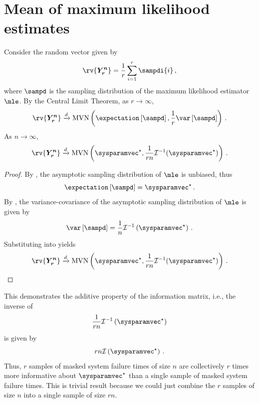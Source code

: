 \documentclass[../main.tex]{subfiles}
\begin{document}
\chapter{Mean of maximum likelihood estimates}
Consider the random vector given by
\begin{equation}
    \rv{\vec{Y_r^n}} = \frac{1}{r} \sum_{i=1}^{r} \sampdi{i}\,,
\end{equation}
where $\sampd$ is the sampling distribution of the maximum likelihood estimator $\mle$. By the Central Limit Theorem, as $r \to \infty$,
\begin{equation}
\label{eq:clt_y_rn}
    \rv{\vec{Y_r^n}} \xrightarrow{d} \mvn\left(\expectation\left[\sampd\right], \frac{1}{r} \var\left[\sampd\right]\right)\,.
\end{equation}
As $n \to \infty$,
\begin{equation}
    \rv{\vec{Y_r^n}} \xrightarrow{d} \mvn\left(\tparam\sysparamvec, \frac{1}{r n}\infomatrx^{-1}(\tparam\sysparamvec) \right)\,.
\end{equation}
\begin{proof}
By \Cref{}, the asymptotic sampling distribution of $\mle$ is unbiased, thus
\begin{equation}
\label{eq:proof_y_r_n_expect}
    \expectation\left[\sampd\right] = \tparam\sysparamvec\,.
\end{equation}
By \Cref{}, the variance-covariance of the asymptotic sampling distribution of $\mle$ is given by
\begin{equation}
\label{eq:proof_y_r_n_var}
    \var\left[\sampd\right] = \frac{1}{n} \infomatrx^{-1}\left(\tparam\sysparamvec\right)\,.
\end{equation}
Substituting  into  yields
\begin{equation}
    \rv{\vec{Y_r^n}} \xrightarrow{d} \mvn\left(\tparam\sysparamvec, \frac{1}{r n}\infomatrx^{-1}(\tparam\sysparamvec) \right)\,.
\end{equation}
\end{proof}
This demonstrates the additive property of the information matrix, i.e., the inverse of
\begin{equation}
    \frac{1}{r n} \infomatrx^{-1}\left(\tparam\sysparamvec\right)
\end{equation}
is given by
\begin{equation}
    r n \infomatrx\left(\tparam\sysparamvec\right)\,.
\end{equation}
Thus, $r$ samples of masked system failure times of size $n$ are collectively $r$ times more informative about $\tparam\sysparamvec$ than a single sample of masked system failure times. This is trivial result because we could just combine the $r$ samples of size $n$ into a single sample of size $r n$.
\end{document}
